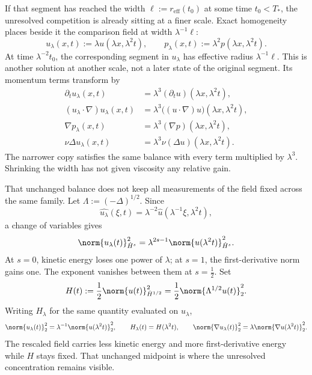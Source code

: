 
If that segment has reached the width \(\ell:=r_{\mathrm{eff}}(t_0)\) at some time \(t_0<T_*\), the unresolved competition is already sitting at a finer scale. Exact \NavierStokes{} homogeneity places beside it the comparison field at width \(\lambda^{-1}\ell\):
\[
  u_\lambda(x,t)
  :=
  \lambda u(\lambda x,\lambda^2t),
  \qquad
  p_\lambda(x,t)
  :=
  \lambda^2p(\lambda x,\lambda^2t).
\]
At time \(\lambda^{-2}t_0\), the corresponding segment in \(u_\lambda\) has effective radius \(\lambda^{-1}\ell\). This is another solution at another scale, not a later state of the original segment. Its momentum terms transform by
\[
\begin{aligned}
  \partial_tu_\lambda(x,t)
  &=
  \lambda^3(\partial_tu)(\lambda x,\lambda^2t),
  \\
  (u_\lambda\cdot\nabla)u_\lambda(x,t)
  &=
  \lambda^3\bigl((u\cdot\nabla)u\bigr)(\lambda x,\lambda^2t),
  \\
  \nabla p_\lambda(x,t)
  &=
  \lambda^3(\nabla p)(\lambda x,\lambda^2t),
  \\
  \nu\Delta u_\lambda(x,t)
  &=
  \lambda^3\nu(\Delta u)(\lambda x,\lambda^2t).
\end{aligned}
\]
The narrower copy satisfies the same balance with every term multiplied by \(\lambda^3\). Shrinking the width has not given viscosity any relative gain.


That unchanged balance does not keep all measurements of the field fixed across the same family. Let \(\Lambda:=(-\Delta)^{1/2}\). Since
\[
  \widehat{u_\lambda}(\xi,t)
  =
  \lambda^{-2}\widehat u(\lambda^{-1}\xi,\lambda^2t),
\]
a change of variables gives
\[
  \norm{u_\lambda(t)}_{\dot H^s}^2
  =
  \lambda^{2s-1}
  \norm{u(\lambda^2t)}_{\dot H^s}^2.
\]
At \(s=0\), kinetic energy loses one power of \(\lambda\); at \(s=1\), the first-derivative norm gains one. The exponent vanishes between them at \(s=\tfrac12\). Set
\[
  H(t)
  :=
  \frac12\norm{u(t)}_{\dot H^{1/2}}^2
  =
  \frac12\norm{\Lambda^{1/2}u(t)}_2^2.
\]
Writing \(H_\lambda\) for the same quantity evaluated on \(u_\lambda\),
\[
  \norm{u_\lambda(t)}_2^2
  =
  \lambda^{-1}\norm{u(\lambda^2t)}_2^2,
  \qquad
  H_\lambda(t)=H(\lambda^2t),
  \qquad
  \norm{\nabla u_\lambda(t)}_2^2
  =
  \lambda\norm{\nabla u(\lambda^2t)}_2^2.
\]
The rescaled field carries less kinetic energy and more first-derivative energy while \(H\) stays fixed. That unchanged midpoint is where the unresolved concentration remains visible.

